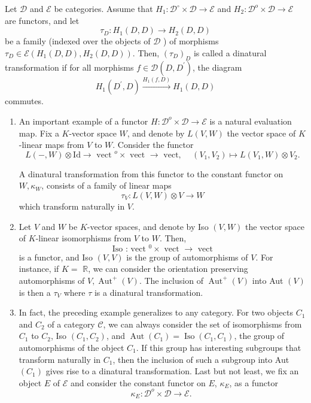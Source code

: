 Let $\mathcal{D}$ and $\mathcal{E}$ be categories. Assume that $H_1: \mathcal{D}^{\circ} \times \mathcal{D} \rightarrow \mathcal{E}$ and $H_2: \mathcal{D}^o \times \mathcal{D} \rightarrow \mathcal{E}$ are functors, and let
$$
\tau_D: H_1(D, D) \rightarrow H_2(D, D)
$$
be a family (indexed over the objects of $\mathcal{D}$ ) of morphisms $\tau_D \in \mathcal{E}\left(H_1(D, D), H_2(D, D)\right)$. Then, $\left(\tau_D\right)_D$ is called a dinatural transformation if for all morphisms $f \in \mathcal{D}\left(D, D^{\prime}\right)$, the diagram
$$
H_1\left(D^{\prime}, D\right) \xrightarrow{H_1(f, D)} H_1(D, D)
$$
commutes.

\begin{enumerate}
    \item An important example of a functor $H: \mathcal{D}^o \times \mathcal{D} \rightarrow \mathcal{E}$ is a natural evaluation map. Fix a $K$-vector space $W$, and denote by $L(V, W)$ the vector space of $K$-linear maps from $V$ to $W$. Consider the functor
    $$
    L(-, W) \otimes \mathrm{Id} \rightarrow \text { vect }^o \times \text { vect } \rightarrow \text { vect, } \quad\left(V_1, V_2\right) \mapsto L\left(V_1, W\right) \otimes V_2 .
    $$
    
    A dinatural transformation from this functor to the constant functor on $W, \kappa_W$, consists of a family of linear maps
    $$
    \tau_V: L(V, W) \otimes V \rightarrow W
    $$
    which transform naturally in $V$.
    \item Let $V$ and $W$ be $K$-vector spaces, and denote by Iso $(V, W)$ the vector space of $K$-linear isomorphisms from $V$ to $W$. Then,
    $$
    \text { Iso : vect }{ }^0 \times \text { vect } \rightarrow \text { vect }
    $$
    is a functor, and Iso $(V, V)$ is the group of automorphisms of $V$. For instance, if $K=$ $\mathbb{R}$, we can consider the orientation preserving automorphisms of $V, \operatorname{Aut}^{+}(V)$. The inclusion of $\operatorname{Aut}^{+}(V)$ into Aut $(V)$ is then a $\tau_V$ where $\tau$ is a dinatural transformation. 
    \item In fact, the preceding example generalizes to any category. For two objects $C_1$ and $C_2$ of a category $\mathcal{C}$, we can always consider the set of isomorphisms from $C_1$ to $C_2$, Iso $\left(C_1, C_2\right)$, and $\operatorname{Aut}\left(C_1\right)=\operatorname{Iso}\left(C_1, C_1\right)$, the group of automorphisms of the object $C_1$. If this group has interesting subgroups that transform naturally in $C_1$, then the inclusion of such a subgroup into Aut $\left(C_1\right)$ gives rise to a dinatural transformation. Last but not least, we fix an object $E$ of $\mathcal{E}$ and consider the constant functor on $E$, $\kappa_E$, as a functor
    $$
    \kappa_E: \mathcal{D}^o \times \mathcal{D} \rightarrow \mathcal{E} \text {. }
    $$
\end{enumerate}

